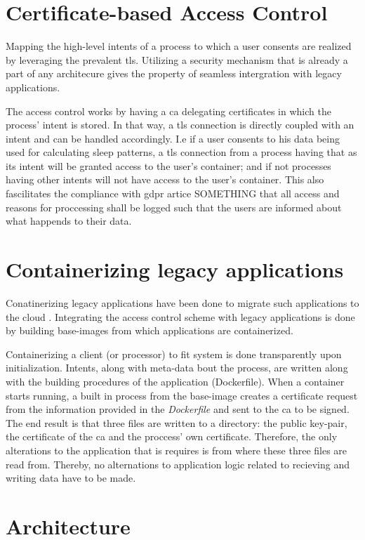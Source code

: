 \documentclass[USenglish]{uit-thesis}
\begin{document}
\section{Certificate-based Access Control}
Mapping the high-level intents of a process to which a user consents are realized by
leveraging the prevalent \gls{tls}.
Utilizing a security mechanism that is already a part of any architecure gives
the property of seamless intergration with legacy applications.

The access control works by having a \gls{ca} delegating certificates in which the process'
intent is stored.
In that way, a \gls{tls} connection is directly coupled with an intent and can be
handled accordingly.
I.e if a user consents to his data being used for calculating sleep patterns, a \gls{tls}
connection from a process having that as its intent will be granted access to the user's
container; and if not processes having other intents will not have access to the user's container.
This also fascilitates the compliance with \gls{gdpr} artice SOMETHING that all access and reasons
for proccessing shall be logged such that the users are informed about what happends to their data.

\section{Containerizing legacy applications}
Conatinerizing legacy applications have been done to migrate
such applications to the cloud \cite{7092950}.
Integrating the access control scheme with legacy applications is done by
building base-images from which applications are containerized.

Containerizing a client (or processor) to fit system is done transparently upon
initialization.
Intents, along with meta-data bout the process, are written along with the building procedures
of the application (Dockerfile).
When a container starts running, a built in process from the base-image creates a certificate request
from the information provided in the \textit{Dockerfile} and sent to the \gls{ca} to be signed.
The end result is that three files are written to a directory: the public key-pair,
the certificate of the \gls{ca} and the proccess' own certificate.
Therefore, the only alterations to the application that is requires is from where
these three files are read from.
Thereby, no alternations to application logic related to recieving and writing data have
to be made.


\section{Architecture}





\end{document}
